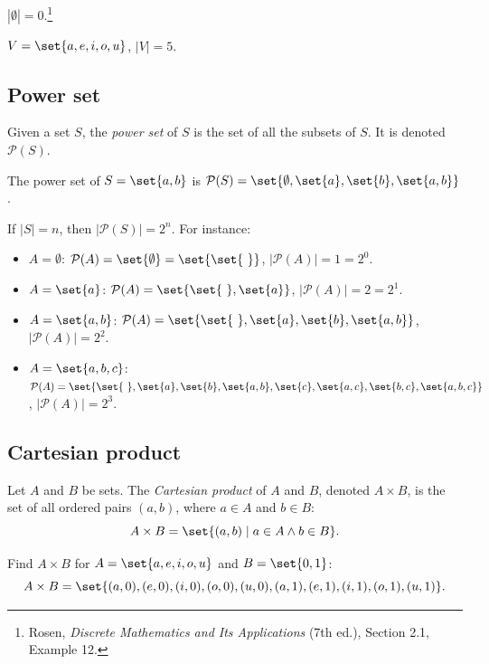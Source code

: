 \begin{example}
$|\emptyset| = 0$.\footnote{Rosen, \emph{Discrete Mathematics and Its Applications} (7th ed.), Section 2.1, Example 12.}
\end{example}
\begin{example}
$V = \set{a, e, i, o, u}$, $|V| = 5$.
\end{example}

\subsection{Power set}
\begin{definition}
Given a set $S$, the \emph{power set} of $S$ is the set of all the subsets of $S$. It is denoted $\mathcal{P}(S)$.
\end{definition}

\begin{example}
The power set of $S = \set{a,b}$ is $\mathcal{P}(S) = \set{\emptyset, \set{a}, \set{b}, \set{a,b}}$.
\end{example}

If $|S| = n$, then $|\mathcal{P}(S)| = 2^n$. For instance:
\begin{itemize}
\item $A = \emptyset$: $\mathcal{P}(A) = \set{\emptyset} = \set{\set{\ }}$, \quad $|\mathcal{P}(A)| = 1 = 2^0$.
\item $A = \set{a}$: $\mathcal{P}(A) = \set{\set{\ }, \set{a}}$, \quad $|\mathcal{P}(A)| = 2 = 2^1$.
\item $A = \set{a,b}$: $\mathcal{P}(A) = \set{\set{\ }, \set{a}, \set{b}, \set{a,b}}$, \quad $|\mathcal{P}(A)| = 2^2$.
\item $A = \set{a,b,c}$: $\mathcal{P}(A) = \set{\set{\ }, \set{a}, \set{b}, \set{a,b}, \set{c}, \set{a,c}, \set{b,c}, \set{a,b,c}}$, \quad $|\mathcal{P}(A)| = 2^3$.
\end{itemize}

\subsection{Cartesian product}
\begin{definition}
Let $A$ and $B$ be sets. The \emph{Cartesian product} of $A$ and $B$, denoted $A \times B$, is the set of all ordered pairs $(a,b)$, where $a \in A$ and $b \in B$:
\[
A \times B = \set{(a,b) \mid a \in A \wedge b \in B}.
\]
\end{definition}

\begin{example}
Find $A \times B$ for $A = \set{a,e,i,o,u}$ and $B = \set{0,1}$:
\[
A \times B = \set{(a,0),(e,0),(i,0),(o,0),(u,0),(a,1),(e,1),(i,1),(o,1),(u,1)}.
\]
\end{example}

